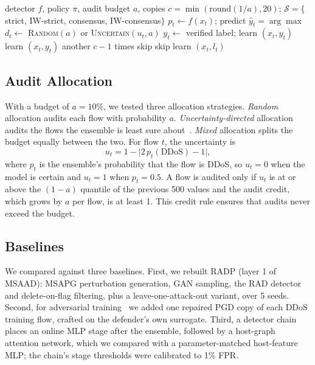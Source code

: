 \documentclass[conference]{IEEEtran}
\begin{document}
\begin{algorithm}[t]
\caption{Prequential test loop with audits and update policy $\pi$. $\mathcal{S}$ is the set of policies that never learn an unverified benign label.}
\label{alg:policy}
\begin{algorithmic}[1]
\small
\REQUIRE detector $f$, policy $\pi$, audit budget $a$, copies $c=\min(\mathrm{round}(1/a),20)$; $\mathcal{S}=\{$strict, IW-strict, consensus, IW-consensus$\}$
  \STATE $p_t \gets f(x_t)$;\; predict $\hat y_t = \arg\max$
  \STATE $d_t \gets$ \textsc{Random}$(a)$ or \textsc{Uncertain}$(u_t, a)$
    \STATE $y_t \gets$ verified label; learn $(x_t, y_t)$
      \STATE learn $(x_t, y_t)$ another $c-1$ times
    \ENDIF
    \STATE skip 
    \STATE skip 
  \ELSE
    \STATE learn $(x_t, l_t)$
  \ENDIF
\ENDFOR
\end{algorithmic}
\end{algorithm}

\subsection{Audit Allocation}
With a budget of $a = 10\%$, we tested three allocation strategies.
\textit{Random} allocation audits each flow with probability $a$.
\textit{Uncertainty-directed} allocation audits the flows the ensemble is least
sure about~\cite{settles2009active}. \textit{Mixed} allocation splits the
budget equally between the two. For flow $t$, the uncertainty is
\begin{equation}
u_t = 1 - \bigl\lvert 2\,p_t(\mathrm{DDoS}) - 1 \bigr\rvert ,
\label{eq:unc}
\end{equation}
where $p_t$ is the ensemble's probability that the flow is DDoS, so $u_t = 0$
when the model is certain and $u_t = 1$ when $p_t = 0.5$. A flow is audited
only if $u_t$ is at or above the $(1 - a)$ quantile of the previous 500 values
and the audit credit, which grows by $a$ per flow, is at least 1. This credit
rule ensures that audits never exceed the budget.

\subsection{Baselines}
We compared against three baselines. First, we rebuilt RADP (layer 1 of MSAAD):
MSAPG perturbation generation, GAN sampling, the RAD detector and
delete-on-flag filtering, plus a leave-one-attack-out variant, over 5 seeds.
Second, for adversarial training~\cite{madry2018pgd} we added one repaired PGD
copy of each DDoS training flow, crafted on the defender's own surrogate.
Third, a detector chain places an online MLP stage after the ensemble, followed
by a host-graph attention network, which we compared with a parameter-matched
host-feature MLP; the chain's stage thresholds were calibrated to 1\% FPR.
\end{document}
